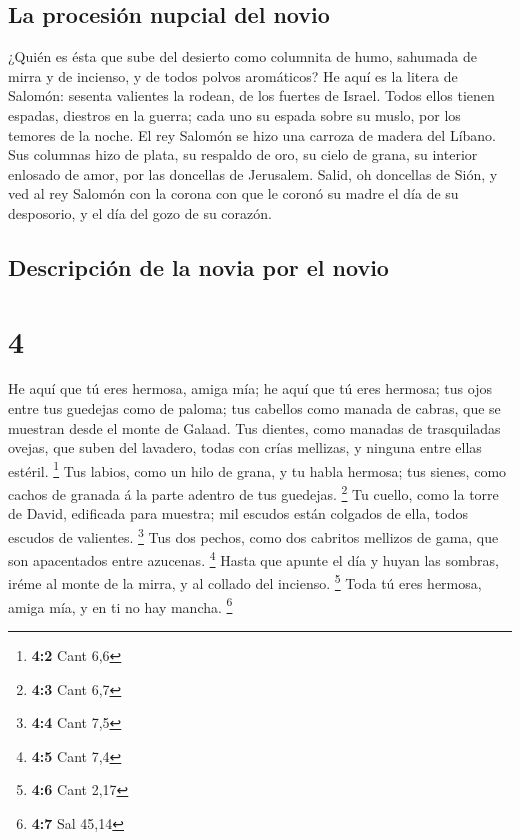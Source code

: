 \hypertarget{la-procesiuxf3n-nupcial-del-novio}{%
\subsection{La procesión nupcial del
novio}\label{la-procesiuxf3n-nupcial-del-novio}}

 ¿Quién es ésta que sube del desierto como columnita de
humo, sahumada de mirra y de incienso, y de todos polvos aromáticos?
 He aquí es la litera de Salomón: sesenta valientes la
rodean, de los fuertes de Israel.  Todos ellos tienen
espadas, diestros en la guerra; cada uno su espada sobre su muslo, por
los temores de la noche.  El rey Salomón se hizo una
carroza de madera del Líbano.  Sus columnas hizo de
plata, su respaldo de oro, su cielo de grana, su interior enlosado de
amor, por las doncellas de Jerusalem.  Salid, oh
doncellas de Sión, y ved al rey Salomón con la corona con que le coronó
su madre el día de su desposorio, y el día del gozo de su corazón.

\hypertarget{descripciuxf3n-de-la-novia-por-el-novio}{%
\subsection{Descripción de la novia por el
novio}\label{descripciuxf3n-de-la-novia-por-el-novio}}

\hypertarget{section-3}{%
\section{4}\label{section-3}}

 He aquí que tú eres hermosa, amiga mía; he aquí que tú
eres hermosa; tus ojos entre tus guedejas como de paloma; tus cabellos
como manada de cabras, que se muestran desde el monte de Galaad.
 Tus dientes, como manadas de trasquiladas ovejas, que
suben del lavadero, todas con crías mellizas, y ninguna entre ellas
estéril. \footnote{\textbf{4:2} Cant 6,6}  Tus labios,
como un hilo de grana, y tu habla hermosa; tus sienes, como cachos de
granada á la parte adentro de tus guedejas. \footnote{\textbf{4:3} Cant
  6,7}  Tu cuello, como la torre de David, edificada para
muestra; mil escudos están colgados de ella, todos escudos de valientes.
\footnote{\textbf{4:4} Cant 7,5}  Tus dos pechos, como dos
cabritos mellizos de gama, que son apacentados entre azucenas.
\footnote{\textbf{4:5} Cant 7,4}  Hasta que apunte el día
y huyan las sombras, iréme al monte de la mirra, y al collado del
incienso. \footnote{\textbf{4:6} Cant 2,17}  Toda tú eres
hermosa, amiga mía, y en ti no hay mancha. \footnote{\textbf{4:7} Sal
  45,14}

